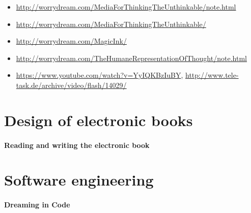 \documentclass{article}
\begin{document}
\begin{itemize}
\item \url{http://worrydream.com/MediaForThinkingTheUnthinkable/note.html}
\item \url{http://worrydream.com/MediaForThinkingTheUnthinkable/}
\item \url{http://worrydream.com/MagicInk/}
\item \url{http://worrydream.com/TheHumaneRepresentationOfThought/note.html}
\item \url{https://www.youtube.com/watch?v=YyIQKBzIuBY}, \url{http://www.tele-task.de/archive/video/flash/14029/}
\end{itemize}

\section{Design of electronic books}

\paragraph{Reading and writing the electronic book~\cite{marshall2009reading}}

\section{Software engineering}

\paragraph{Dreaming in Code}


\end{document}
